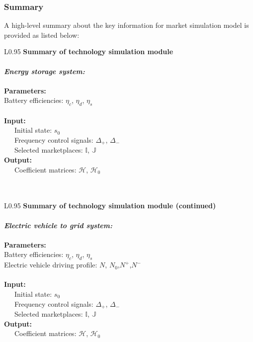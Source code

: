 \subsubsection{Summary}
A high-level summary about the key information for market simulation model is provided as listed below:
\begin{table}[h!]
	\begin{tabular}{L{0.95\textwidth}}
		\hline
		\textbf{Summary of technology simulation module} \\
		\hline
		\\
		\textit{\textbf{Energy storage system:}}\\
		\\
		\textbf{Parameters:} \\
		Battery efficiencies: $\eta_c$, $\eta_d$, $\eta_s$\\
		\\
		\textbf{Input:} \\
		~~~Initial state: $s_0$ \\
		~~~Frequency control signals: $\Delta_+$, $\Delta_-$\\
		~~~Selected marketplaces: $\mathbb{I}$, $\mathbb{J}$
		\\
		\textbf{Output:} \\
		~~~Coefficient matrices:  $\mathcal{H}$, $\mathcal{H}_0$  \\
		\\
		\hline
		\\
	\end{tabular}
\end{table}
\begin{table}[h!]
	\begin{tabular}{L{0.95\textwidth}}
		\hline
		\textbf{Summary of technology simulation module (continued)} \\
		\hline
		\\
		\textit{\textbf{Electric vehicle to grid system:}}\\
		\\
		\textbf{Parameters:} \\
		Battery efficiencies: $\eta_c$, $\eta_d$, $\eta_s$\\
		Electric vehicle driving profile: $N$, $N_0$,$N^+$,$N^-$\\
		\\
		\textbf{Input:} \\
		~~~Initial state: $s_0$ \\
		~~~Frequency control signals: $\Delta_+$, $\Delta_-$\\
		~~~Selected marketplaces: $\mathbb{I}$, $\mathbb{J}$
		\\
		\textbf{Output:} \\
		~~~Coefficient matrices:  $\mathcal{H}$, $\mathcal{H}_0$  \\
		\\
		\hline
	\end{tabular}
\end{table}
~\newpage
